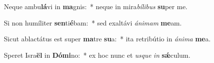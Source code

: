 \item Neque ambu\textbf{lá}vi in \textbf{ma}gnis:~* neque in mira\textit{bí}\textit{li}\textit{bus} \textbf{su}per me.
\item Si non humíliter \textbf{sen}ti\textbf{é}bam:~* sed exaltávi \textit{á}\textit{ni}\textit{mam} \textbf{me}am.
\item Sicut ablactátus est super \textbf{ma}tre \textbf{su}a:~* ita retribútio in \textit{á}\textit{ni}\textit{ma} \textbf{me}a.
\item Speret Isra\textbf{ël} in \textbf{Dó}\textbf{mi}no:~* ex hoc nunc et \textit{us}\textit{que} \textit{in} \textbf{sǽ}culum.
